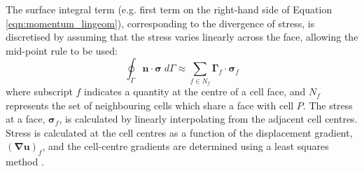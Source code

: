 \documentclass[sn-mathphys,Numbered]{sn-jnl}%
\newcommand{\bb}{\boldsymbol}
\begin{document}
The surface integral term (e.g. first term on the right-hand side of Equation \ref{eqn:momentum_lingeom}), corresponding to the divergence of stress, is discretised by assuming that the stress varies linearly across the face, allowing the mid-point rule to be used:
\begin{equation}
	\oint_{\Gamma} \bb{n} \cdot \bb{\sigma}  \; d\Gamma
	\approx 
	\sum_{f \in N_f} \bb{\Gamma}_{f} \cdot \bb{\sigma}_f
\end{equation}
where subscript $f$ indicates a quantity at the centre of a cell face, and $N_f$ represents the set of neighbouring cells which share a face with cell $P$.
The stress at a face, $\bb{\sigma}_f$, is calculated by linearly interpolating from the adjacent cell centres.
Stress is calculated at the cell centres as a function of the displacement gradient, $\left(\bb{\nabla}\bb{u}\right)_f$, and the cell-centre gradients are determined using a least squares method \cite{noauthor_openfoam_2015}.
\end{document}
